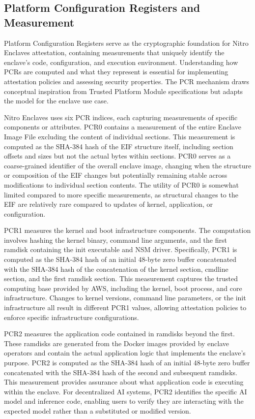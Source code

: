\subsection{Platform Configuration Registers and Measurement}

Platform Configuration Registers serve as the cryptographic foundation for Nitro Enclaves attestation, containing measurements that uniquely identify the enclave's code, configuration, and execution environment. Understanding how PCRs are computed and what they represent is essential for implementing attestation policies and assessing security properties. The PCR mechanism draws conceptual inspiration from Trusted Platform Module specifications but adapts the model for the enclave use case.

Nitro Enclaves uses six PCR indices, each capturing measurements of specific components or attributes. PCR0 contains a measurement of the entire Enclave Image File excluding the content of individual sections. This measurement is computed as the SHA-384 hash of the EIF structure itself, including section offsets and sizes but not the actual bytes within sections. PCR0 serves as a coarse-grained identifier of the overall enclave image, changing when the structure or composition of the EIF changes but potentially remaining stable across modifications to individual section contents. The utility of PCR0 is somewhat limited compared to more specific measurements, as structural changes to the EIF are relatively rare compared to updates of kernel, application, or configuration.

PCR1 measures the kernel and boot infrastructure components. The computation involves hashing the kernel binary, command line arguments, and the first ramdisk containing the init executable and NSM driver. Specifically, PCR1 is computed as the SHA-384 hash of an initial 48-byte zero buffer concatenated with the SHA-384 hash of the concatenation of the kernel section, cmdline section, and the first ramdisk section. This measurement captures the trusted computing base provided by AWS, including the kernel, boot process, and core infrastructure. Changes to kernel versions, command line parameters, or the init infrastructure all result in different PCR1 values, allowing attestation policies to enforce specific infrastructure configurations.

PCR2 measures the application code contained in ramdisks beyond the first. These ramdisks are generated from the Docker images provided by enclave operators and contain the actual application logic that implements the enclave's purpose. PCR2 is computed as the SHA-384 hash of an initial 48-byte zero buffer concatenated with the SHA-384 hash of the second and subsequent ramdisks. This measurement provides assurance about what application code is executing within the enclave. For decentralized AI systems, PCR2 identifies the specific AI model and inference code, enabling users to verify they are interacting with the expected model rather than a substituted or modified version.

